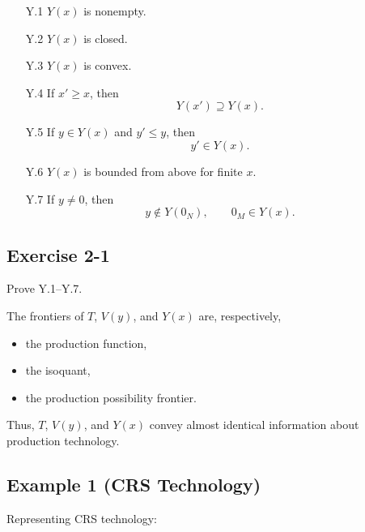\begin{itemize}
    \item[Y.1] $Y(x)$ is nonempty.
    
    \item[Y.2] $Y(x)$ is closed.
    
    \item[Y.3] $Y(x)$ is convex.
    
    \item[Y.4] If $x' \ge x$, then
    \[
    Y(x') \supseteq Y(x).
    \]
    
    \item[Y.5] If $y \in Y(x)$ and $y' \le y$, then
    \[
    y' \in Y(x).
    \]
    
    \item[Y.6] $Y(x)$ is bounded from above for finite $x$.
    
    \item[Y.7] If $y \ne 0$, then
    \[
    y \notin Y(0_N),
    \qquad
    0_M \in Y(x).
    \]
\end{itemize}

\begin{tcolorbox}[breakable]

\subsection*{Exercise 2-1}


Prove Y.1--Y.7.

\end{tcolorbox}

\medskip

The frontiers of $T$, $V(y)$, and $Y(x)$ are, respectively,


\begin{itemize}
    \item the production function,
    \item the isoquant,
    \item the production possibility frontier.
\end{itemize}

Thus, $T$, $V(y)$, and $Y(x)$ convey almost identical information
about production technology.




\subsection*{Example 1 (CRS Technology)}

Representing CRS technology:


